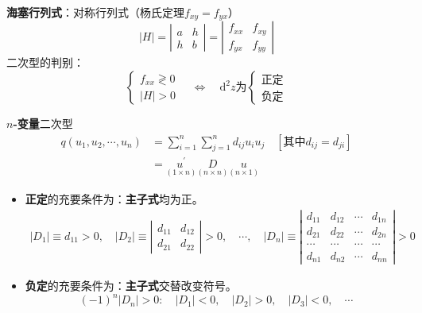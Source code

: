 \documentclass[12pt, a4paper, oneside]{article}
\begin{document}
\begin{CJK*}{UTF8}{gbsn}
\noindent
\textbf{海塞行列式}：对称行列式（杨氏定理$f_{x y}=f_{y x}$）
$$
|H|
=\left|\begin{array}{cc}a & h \\ h & b\end{array}\right|
=\left|\begin{array}{ll}f_{x x} & f_{x y} \\ f_{y x} & f_{y y}\end{array}\right|
$$
二次型的判别：
$$
\left\{\begin{array}{l}f_{x x} \gtrless 0 \\ |H|>0\end{array}\right.
\quad\Longleftrightarrow\quad
\mathrm{d}^{2} z \text{为}\left\{\begin{array}{l}\text{正定} \\ \text{负定}\end{array}\right.
$$

\noindent
\textbf{$n$-变量}二次型
$$
\begin{aligned}
	q\left(u_{1}, u_{2}, \cdots, u_{n}\right) 
	& =
	\sum_{i=1}^{n} \sum_{j=1}^{n} d_{i j} u_{i} u_{j} 
	\quad [\text{其中}d_{i j}=d_{ji}]
	\\ & =
	\underset{(1 \times n)}{u^{\prime}} \underset{(n \times n)}{D} \underset{(n \times 1)}{u} 
\end{aligned}
$$

\begin{itemize}
	\item \textbf{正定}的充要条件为：\textbf{主子式}均为正。
		$$
		\begin{array}{c}
			\left|D_{1}\right| \equiv d_{11}>0,
			\quad
			\left|D_{2}\right| \equiv 
				\left|
				\begin{array}{ll}d_{11} & d_{12} \\ d_{21} & d_{22}\end{array}
				\right| >0, 
			\quad \cdots, 
			\quad
			\left|D_{n}\right| \equiv\left|\begin{array}{cccc}d_{11} & d_{12} & \cdots & d_{1 n} \\ d_{21} & d_{22} & \cdots & d_{2 n} \\ \cdots &\cdots &\cdots &\cdots  \\ d_{n 1} & d_{n 2} & \cdots & d_{n n}\end{array}\right| > 0
		\end{array}
		$$
	\item \textbf{负定}的充要条件为：\textbf{主子式}交替改变符号。
		$$
		(-1)^{n}\left|D_{n}\right|>0 : \quad 
		\left|D_{1}\right|<0, \quad \left|D_{2}\right|>0, \quad \left|D_{3}\right|<0, \quad \cdots
		$$
\end{itemize}


\end{CJK*}
\end{document}
